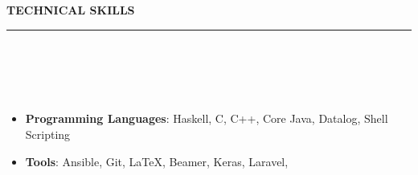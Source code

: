 \documentclass[a4paper,10pt]{article}
\newcommand{\lsep}{-0.5cm}
\newcommand{\resheading}[1]{{\small
        {
            \begin{minipage}
                {0.975\textwidth}\textbf{{\textsc{#1 \vphantom{p\^{E}} }}}
                \\[-0.3cm]
                \hrule
            \end{minipage}
            \\[-0.5cm]
        }
 }}
\begin{document}
\vspace{0.1cm}
\resheading{\textbf{\large TECHNICAL SKILLS}} \\[\lsep] 
\\[-0.4cm]
\begin{itemize}
  \item \textbf{Programming Languages}: Haskell, C, C++, Core Java, Datalog, Shell Scripting  \\[-0.6cm]
  \item \textbf{Tools}: Ansible, Git, \LaTeX, Beamer, Keras, Laravel, \\[-0.6cm]
\end{itemize}
\end{document}
